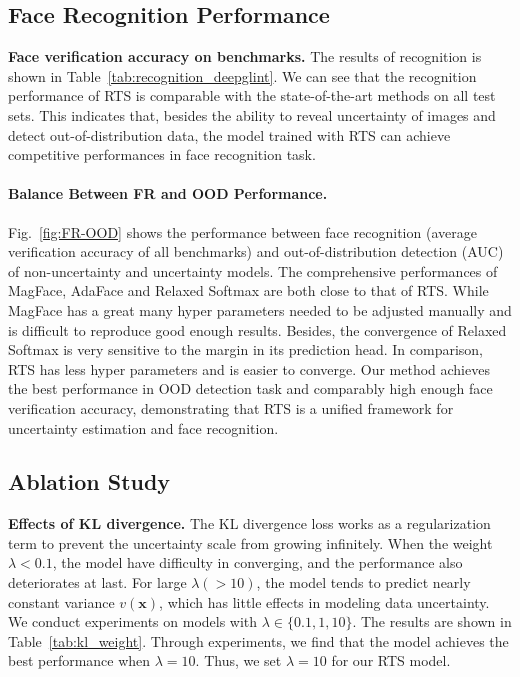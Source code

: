 \documentclass[letterpaper]{article} %
\begin{document}
\vspace{-0.82mm}
\subsection{Face Recognition Performance}
\label{ssec:face recognition}
\textbf{Face verification accuracy on benchmarks.} The results of recognition is shown in Table~\ref{tab:recognition_deepglint}. We can see that the recognition performance of RTS is comparable with the state-of-the-art methods on all test sets. This indicates that, besides the ability to reveal uncertainty of images and detect out-of-distribution data, the model trained with RTS can achieve competitive performances in face recognition task.

\paragraph{Balance Between FR and OOD Performance. } Fig.~\ref{fig:FR-OOD} shows the performance between face recognition (average verification accuracy of all benchmarks) and out-of-distribution detection (AUC) of non-uncertainty and uncertainty models. The comprehensive performances of MagFace, AdaFace and Relaxed Softmax are both close to that of RTS. While MagFace has a great many hyper parameters needed to be adjusted manually and is difficult to reproduce good enough results. Besides, the convergence of Relaxed Softmax is very sensitive to the margin in its prediction head. In comparison, RTS has less hyper parameters and is easier to converge. Our method achieves the best performance in OOD detection task and comparably high enough face verification accuracy, demonstrating that RTS is a unified framework for uncertainty estimation and face recognition.










\vspace{-0.85mm}
\subsection{Ablation Study}
\label{ssec:ablation}

\textbf{Effects of KL divergence.} The KL divergence loss works as a regularization term to prevent the uncertainty scale from growing infinitely. When the weight $\lambda < 0.1$, the model have difficulty in converging, and the performance also deteriorates at last.
For large $\lambda (>10)$, the model tends to predict nearly constant variance $v(\bm{x})$, which has little effects in modeling data uncertainty.
We conduct experiments on models with $\lambda \in \{0.1, 1, 10\}$. The results are shown in Table~\ref{tab:kl_weight}.
Through experiments, we find that the model achieves the best performance when $\lambda = 10$. Thus, we set $\lambda = 10$ for our RTS model.
\end{document}
